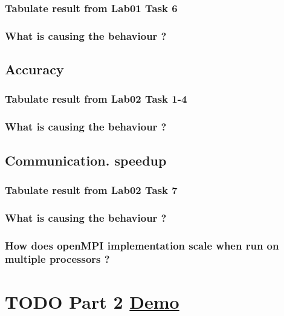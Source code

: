 \documentclass[11pt]{article}
\begin{document}
\subsubsection{Tabulate result from Lab01 Task 6}
\label{sec:org2321671}

\subsubsection{What is causing the behaviour ?}
\label{sec:org1e982ca}

\subsection{Accuracy}
\label{sec:org759d8b8}

\subsubsection{Tabulate result from Lab02 Task 1-4}
\label{sec:orga51b7d7}

\subsubsection{What is causing the behaviour ?}
\label{sec:org086c12f}

\subsection{Communication. speedup}
\label{sec:orgb8b74ae}

\subsubsection{Tabulate result from Lab02 Task 7}
\label{sec:org9e1090a}

\subsubsection{What is causing the behaviour ?}
\label{sec:org6ff353d}

\subsubsection{How does openMPI implementation scale when run on multiple processors ?}
\label{sec:org5cb7abf}

\section{{\bfseries\sffamily TODO} Part 2 \href{http://www.comp.nus.edu.sg/\~hugh/cs3211/project/demo.html}{Demo}}
\label{sec:org59bdcd7}
\end{document}
